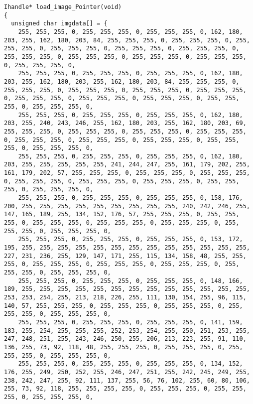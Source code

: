 \documentclass{ctexart}
\begin{document}
\begin{lstlisting}
Ihandle* load_image_Pointer(void)
{
  unsigned char imgdata[] = {
    255, 255, 255, 0, 255, 255, 255, 0, 255, 255, 255, 0, 162, 180, 203, 255, 162, 180, 203, 84, 255, 255, 255, 0, 255, 255, 255, 0, 255, 255, 255, 0, 255, 255, 255, 0, 255, 255, 255, 0, 255, 255, 255, 0, 255, 255, 255, 0, 255, 255, 255, 0, 255, 255, 255, 0, 255, 255, 255, 0, 255, 255, 255, 0,
    255, 255, 255, 0, 255, 255, 255, 0, 255, 255, 255, 0, 162, 180, 203, 255, 162, 180, 203, 255, 162, 180, 203, 84, 255, 255, 255, 0, 255, 255, 255, 0, 255, 255, 255, 0, 255, 255, 255, 0, 255, 255, 255, 0, 255, 255, 255, 0, 255, 255, 255, 0, 255, 255, 255, 0, 255, 255, 255, 0, 255, 255, 255, 0,
    255, 255, 255, 0, 255, 255, 255, 0, 255, 255, 255, 0, 162, 180, 203, 255, 240, 243, 246, 255, 162, 180, 203, 255, 162, 180, 203, 69, 255, 255, 255, 0, 255, 255, 255, 0, 255, 255, 255, 0, 255, 255, 255, 0, 255, 255, 255, 0, 255, 255, 255, 0, 255, 255, 255, 0, 255, 255, 255, 0, 255, 255, 255, 0,
    255, 255, 255, 0, 255, 255, 255, 0, 255, 255, 255, 0, 162, 180, 203, 255, 255, 255, 255, 255, 241, 244, 247, 255, 161, 179, 202, 255, 161, 179, 202, 57, 255, 255, 255, 0, 255, 255, 255, 0, 255, 255, 255, 0, 255, 255, 255, 0, 255, 255, 255, 0, 255, 255, 255, 0, 255, 255, 255, 0, 255, 255, 255, 0,
    255, 255, 255, 0, 255, 255, 255, 0, 255, 255, 255, 0, 158, 176, 200, 255, 255, 255, 255, 255, 255, 255, 255, 255, 240, 242, 246, 255, 147, 165, 189, 255, 134, 152, 176, 57, 255, 255, 255, 0, 255, 255, 255, 0, 255, 255, 255, 0, 255, 255, 255, 0, 255, 255, 255, 0, 255, 255, 255, 0, 255, 255, 255, 0,
    255, 255, 255, 0, 255, 255, 255, 0, 255, 255, 255, 0, 153, 172, 195, 255, 255, 255, 255, 255, 255, 255, 255, 255, 255, 255, 255, 255, 227, 231, 236, 255, 129, 147, 171, 255, 115, 134, 158, 48, 255, 255, 255, 0, 255, 255, 255, 0, 255, 255, 255, 0, 255, 255, 255, 0, 255, 255, 255, 0, 255, 255, 255, 0,
    255, 255, 255, 0, 255, 255, 255, 0, 255, 255, 255, 0, 148, 166, 189, 255, 255, 255, 255, 255, 255, 255, 255, 255, 255, 255, 255, 255, 253, 253, 254, 255, 213, 218, 226, 255, 111, 130, 154, 255, 96, 115, 140, 57, 255, 255, 255, 0, 255, 255, 255, 0, 255, 255, 255, 0, 255, 255, 255, 0, 255, 255, 255, 0,
    255, 255, 255, 0, 255, 255, 255, 0, 255, 255, 255, 0, 141, 159, 183, 255, 254, 255, 255, 255, 252, 253, 254, 255, 250, 251, 253, 255, 247, 248, 251, 255, 243, 246, 250, 255, 206, 213, 223, 255, 91, 110, 136, 255, 73, 92, 118, 48, 255, 255, 255, 0, 255, 255, 255, 0, 255, 255, 255, 0, 255, 255, 255, 0,
    255, 255, 255, 0, 255, 255, 255, 0, 255, 255, 255, 0, 134, 152, 176, 255, 249, 250, 252, 255, 246, 247, 251, 255, 242, 245, 249, 255, 238, 242, 247, 255, 92, 111, 137, 255, 56, 76, 102, 255, 60, 80, 106, 255, 73, 92, 118, 255, 255, 255, 255, 0, 255, 255, 255, 0, 255, 255, 255, 0, 255, 255, 255, 0,

\end{lstlisting}
\end{document}
